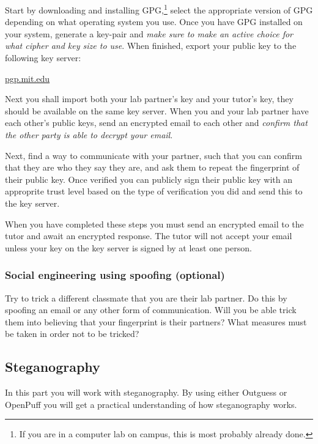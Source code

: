 \documentclass[a4paper]{llncs}
\begin{document}
Start by downloading and installing \ac{GPG},\footnote{%
  If you are in a computer lab on campus, this is most probably already done.
} select the appropriate version of \ac{GPG} depending on what operating system 
you use.
Once you have \ac{GPG} installed on your system, generate a key-pair and 
\emph{make sure to make an active choice for what cipher and key size to use}.
When finished, export your public key to the following key server:
\begin{center}
  \url{pgp.mit.edu}
\end{center}

Next you shall import both your lab partner's key and your tutor's key, they
should be available on the same key server.
When you and your lab partner have each other's public keys, send an encrypted
email to each other and \emph{confirm that the other party is able to decrypt 
your email}.

Next, find a way to communicate with your partner, such that you can
confirm that they are who they say they are, and ask them to repeat the 
fingerprint of their public key.
Once verified you can publicly sign their public key with an approprite trust 
level based on the type of verification you did and send this to the key server.

When you have completed these steps you must send an encrypted email to the 
tutor and await an encrypted response.
The tutor will not accept your email unless your key on the key server is 
signed by at least one person.

\subsubsection{Social engineering using spoofing (optional)}%
\label{subsec:Social}

Try to trick a different classmate that you are their lab partner.
Do this by spoofing an email or any other form of communication.
Will you be able trick them into believing that your fingerprint is their 
partners?
What measures must be taken in order not to be tricked?

\subsection{Steganography}%
\label{subsec:Steganograhy}

In this part you will work with steganography.
By using either Outguess or OpenPuff you will get a practical understanding of 
how steganography works. 
\end{document}
